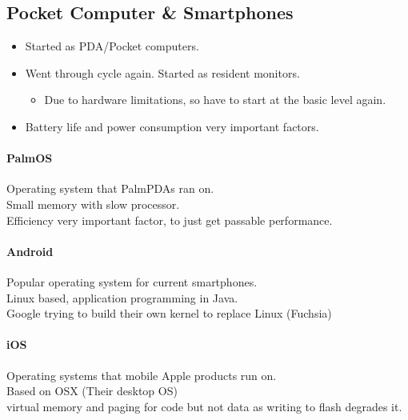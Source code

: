 \documentclass{article}
\begin{document}
	\subsection{Pocket Computer \& Smartphones}
		\begin{itemize}
			\item Started as PDA/Pocket computers.
			\item Went through cycle again. Started as resident monitors.
			\begin{itemize}
				\item Due to hardware limitations, so have to start at the basic level again.
			\end{itemize}
			\item Battery life and power consumption very important factors.
		\end{itemize}

		\paragraph{PalmOS} Operating system that PalmPDAs ran on. \\
		Small memory with slow processor. \\
		Efficiency very important factor, to just get passable performance.

		\paragraph{Android} Popular operating system for current smartphones.\\
		Linux based, application programming in Java. \\
		Google trying to build their own kernel to replace Linux (Fuchsia)

		\paragraph{iOS} Operating systems that mobile Apple products run on. \\
		Based on OSX (Their desktop OS)\\
		virtual memory and paging for code but not data as writing to flash degrades it.
\end{document}
